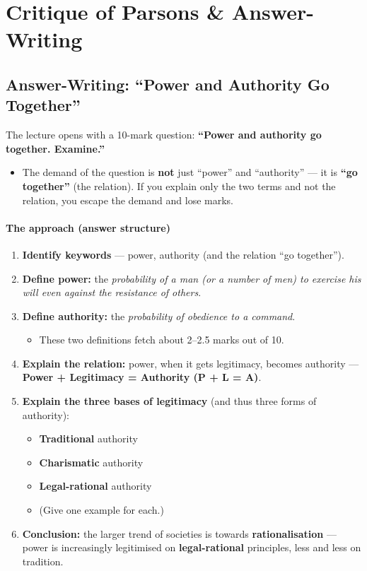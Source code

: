 \sectiondivider

\section{Critique of Parsons \& Answer-Writing}

\subsection{Answer-Writing: ``Power and Authority Go Together''}

The lecture opens with a 10-mark question: \textbf{``Power and authority go together. Examine.''}

\begin{PYQLink}
\begin{itemize}
\item The demand of the question is \textbf{not} just ``power'' and ``authority'' --- it is \textbf{``go together''} (the relation). If you explain only the two terms and not the relation, you escape the demand and lose marks.
\end{itemize}
\end{PYQLink}

\paragraph{The approach (answer structure)}
\begin{enumerate}
\item \textbf{Identify keywords} --- power, authority (and the relation ``go together'').
\item \textbf{Define power:} the \textit{probability of a man (or a number of men) to exercise his will even against the resistance of others}.
\item \textbf{Define authority:} the \textit{probability of obedience to a command}.
\begin{itemize}
\item These two definitions fetch about 2--2.5 marks out of 10.
\end{itemize}
\item \textbf{Explain the relation:} power, when it gets legitimacy, becomes authority --- \textbf{Power + Legitimacy = Authority (P + L = A)}.
\item \textbf{Explain the three bases of legitimacy} (and thus three forms of authority):
\begin{itemize}
\item \textbf{Traditional} authority
\item \textbf{Charismatic} authority
\item \textbf{Legal-rational} authority
\item (Give one example for each.)
\end{itemize}
\item \textbf{Conclusion:} the larger trend of societies is towards \textbf{rationalisation} --- power is increasingly legitimised on \textbf{legal-rational} principles, less and less on tradition.
\end{enumerate}

